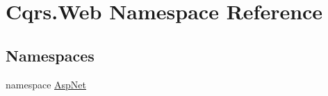 \hypertarget{namespaceCqrs_1_1Web}{}\section{Cqrs.\+Web Namespace Reference}
\label{namespaceCqrs_1_1Web}
\subsection*{Namespaces}
\begin{DoxyCompactItemize}
\item 
namespace \hyperlink{namespaceCqrs_1_1Web_1_1AspNet}{Asp\+Net}
\end{DoxyCompactItemize}

